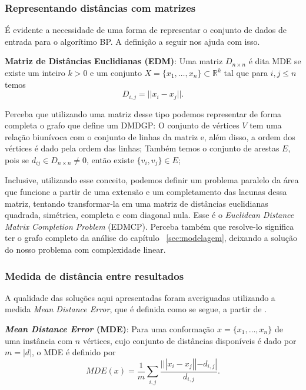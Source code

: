 \documentclass[a4paper,12pt]{article}
\begin{document}
	 \subsubsection{Representando distâncias com matrizes}
	 É evidente a necessidade de uma forma de representar o conjunto de dados de entrada para o algorítimo BP. A definição a seguir nos ajuda com isso.
	 
	 \begin{center}
	 	\begin{minipage}{0.9 \linewidth}
	 		\textbf{Matriz de Distâncias Euclidianas (EDM)}: Uma matriz $D_{n \times n}$ é dita MDE se existe um inteiro $k>0$ e um conjunto $X=\{x_1, \dots, x_n\} \subset \mathbb{R}^k$ tal que para $i,j \leq n$ temos
	 		$$D_{i,j}  =||x_i - x_j||.$$
	 	\end{minipage}
	 \end{center}
	 
	 Perceba que utilizando uma matriz desse tipo podemos representar de forma completa o grafo que define um DMDGP: O conjunto de vértices $V$ tem uma relação biunívoca com o conjunto de linhas da matriz e, além disso, a ordem dos vértices é dado pela ordem das linhas; Também temos o conjunto de arestas $E$, pois se $d_{ij} \in D_{n\times n} \neq 0$, então existe $\{v_i, v_j\} \in E$;
	 
	 Inclusive, utilizando esse conceito, podemos definir um problema paralelo da área \cite{fidalgotese} que funcione a partir de uma extensão e um completamento das lacunas dessa matriz, tentando transformar-la em uma matriz de distâncias euclidianas quadrada, simétrica, completa e com diagonal nula. Esse é o \textit{Euclidean Distance Matrix Completion Problem} (EDMCP). Perceba também que resolve-lo significa ter o grafo completo da análise do capítulo ~\ref{sec:modelagem}, deixando a solução do nosso problema com complexidade linear.
	 
	 \subsubsection{Medida de distância entre resultados}
	 A qualidade das soluções aqui apresentadas foram averiguadas utilizando a medida \textit{Mean Distance Error}, que é definida como se segue, a partir de \cite{mucherino:BP}.
	 
	 \begin{center}
	 	\begin{minipage}{0.9 \linewidth}
	 		\textbf{\textit{Mean Distance Error} (MDE)}: Para uma conformação $x = \{x_1, \dots, x_n\}$ de uma instância com $n$ vértices, cujo conjunto de distâncias disponíveis é dado por $m = |d|$, o MDE é definido por  
	 		$$MDE(x) = \frac{1}{m} \sum_{i,j}^{}\frac{|||x_i - x_j|| - d_{i,j}|}{d_{i,j}} .$$
	 	\end{minipage}
	 \end{center}
	
\end{document}

